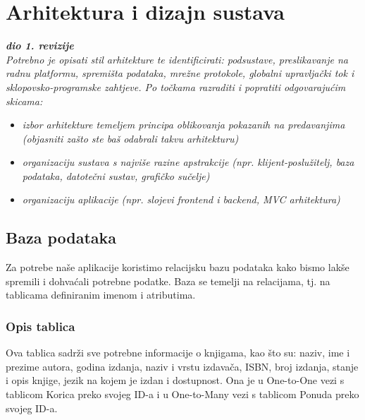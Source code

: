 \chapter{Arhitektura i dizajn sustava}
		
		\textbf{\textit{dio 1. revizije}}\\

		\textit{ Potrebno je opisati stil arhitekture te identificirati: podsustave, preslikavanje na radnu platformu, spremišta podataka, mrežne protokole, globalni upravljački tok i sklopovsko-programske zahtjeve. Po točkama razraditi i popratiti odgovarajućim skicama:}
	\begin{itemize}
		\item 	\textit{izbor arhitekture temeljem principa oblikovanja pokazanih na predavanjima (objasniti zašto ste baš odabrali takvu arhitekturu)}
		\item 	\textit{organizaciju sustava s najviše razine apstrakcije (npr. klijent-poslužitelj, baza podataka, datotečni sustav, grafičko sučelje)}
		\item 	\textit{organizaciju aplikacije (npr. slojevi frontend i backend, MVC arhitektura) }		
	\end{itemize}

	
		

		

				
		\section{Baza podataka}
			
			
		Za potrebe naše aplikacije koristimo relacijsku bazu podataka kako bismo lakše spremili i dohvaćali potrebne podatke. Baza se temelji na relacijama, tj. na tablicama definiranim imenom i atributima.
			
			\subsection{Opis tablica}
			
			
			Ova tablica sadrži sve potrebne informacije o knjigama, kao što su:
				naziv, ime i prezime autora, godina izdanja, naziv i vrstu izdavača, ISBN, broj
				izdanja, stanje i opis knjige, jezik na kojem je izdan i dostupnost. Ona je u
				One-to-One vezi s tablicom Korica preko svojeg ID-a i u One-to-Many vezi s tablicom Ponuda preko svojeg ID-a.
			
